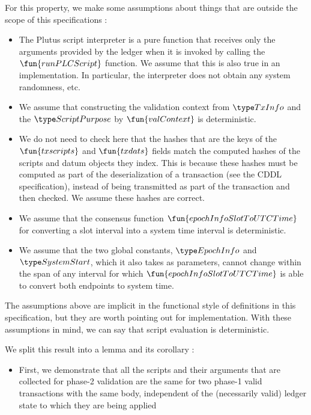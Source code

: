 \begin{property}
  \label{prop:fixed-inputs}

For this property, we make some assumptions about things that are outside the scope of this specifications :

\begin{itemize}
  \item The Plutus script
  interpreter is a pure function that receives only the arguments provided by the ledger when it is
  invoked by calling the $\fun{runPLCScript}$ function. We assume that this is
  also true in an implementation. In particular, the interpreter does not
  obtain any system randomness, etc.

  \item We assume that constructing the validation context from $\TxInfo$ and
  the $\ScriptPurpose$ by $\fun{valContext}$ is deterministic.

  \item We do not need to check here that the hashes that are the keys of the
  $\fun{txscripts}$ and $\fun{txdats}$ fields match the computed hashes of the scripts and
  datum objects they index. This is because these hashes must be computed as part of
  the deserialization of a transaction (see the CDDL specification),
  instead of being transmitted as part of the transaction and then checked. We
  assume these hashes are correct.

  \item We assume that the consensus
  function $\fun{epochInfoSlotToUTCTime}$ for converting a slot interval into a
  system time interval is deterministic.

  \item We assume that the two global
  constants, $\EpochInfo$ and $\SystemStart$, which it also takes as parameters,
  cannot change within the span of any interval for which $\fun{epochInfoSlotToUTCTime}$
  is able to convert both endpoints to system time.
\end{itemize}

The assumptions above are implicit in the functional style of definitions in this
specification, but they are worth pointing out for implementation.
With these assumptions in mind, we can say that
script evaluation is deterministic.

We split this result into a lemma and its corollary :

\begin{itemize}
  \item First, we demonstrate that all the scripts and their arguments that are
  collected for phase-2 validation are the same for two phase-1 valid transactions with the same body,
  independent of the (necessarily valid) ledger state to which they are being applied


\end{itemize}
\end{property}
